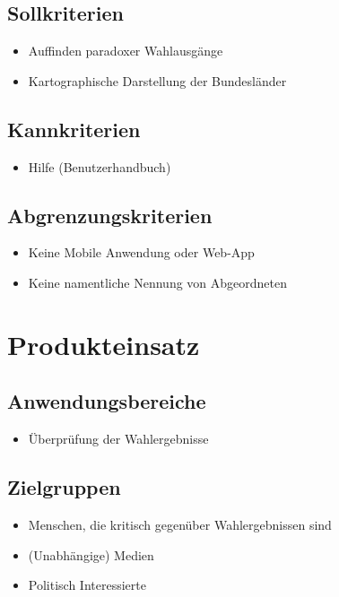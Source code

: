 \documentclass[10pt,a4paper]{article}
\begin{document}
\subsection{Sollkriterien}
\begin{itemize}
\item Auffinden paradoxer Wahlausgänge
\item Kartographische Darstellung der Bundesländer
\end{itemize}

\subsection{Kannkriterien}
\begin{itemize}
\item Hilfe (Benutzerhandbuch)
\end{itemize}


\subsection{Abgrenzungskriterien}
\begin{itemize}
\item Keine Mobile Anwendung oder Web-App
\item Keine namentliche Nennung von Abgeordneten
\end{itemize}


\section{Produkteinsatz}
\subsection{Anwendungsbereiche}
\begin{itemize}
\item Überprüfung der Wahlergebnisse
\end{itemize}


\subsection{Zielgruppen}
\begin{itemize}
\item Menschen, die kritisch gegenüber Wahlergebnissen sind
\item (Unabhängige) Medien
\item Politisch Interessierte
\end{itemize}
\end{document}

